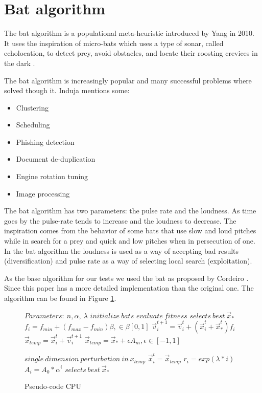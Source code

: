 \documentclass[conference]{IEEEtran}
\begin{document}

\section{Bat algorithm} \label{bat} %

The bat algorithm is a populational meta-heuristic introduced by Yang \cite{original} in
2010. It uses the inspiration of micro-bats which uses a type of sonar,
called echolocation, to detect prey, avoid obstacles, and locate their
roosting crevices in the dark \cite{original}.

The bat algorithm is increasingly popular and many successful problems
where solved though it. Induja \cite{bat-usage} mentions some:

\begin{itemize}
\item Clustering
\item Scheduling
\item Phishing detection
\item Document de-duplication
\item Engine rotation tuning
\item Image processing
\end{itemize}


The bat algorithm has two parameters: the pulse rate and the loudness.
As time goes by the pulse-rate tends to increase and the loudness to
decrease. The inspiration comes from the behavior of some bats that use
 slow and loud pitches while in search for a prey and quick
and low pitches when in persecution of one. In the bat algorithm the
loudness is used as a way of accepting bad results (diversification) and
pulse rate as a way of selecting local search (exploitation).

As the base algorithm for our tests we used the bat as proposed by
Cordeiro \cite{comparisonBatParpinelli}. Since this paper has a more detailed
implementation than the original one. The algorithm can be found in Figure \ref{cpu-pseudo}.

\begin{figure}[H]
\begin{algorithmic}[1]
\State $Parameters:\ n,\alpha,\ \lambda$
\State $initialize\ bats$
\State $evaluate\ fitness$
\State $selects\ best\ \vec{x}_*$
        \State $f_i=f_{min} + (f_{max} - f_{min})\beta, \in \beta [0,1]$
        \State $\vec{v}_i^{t+1} = \vec{v}_i^{t} + (\vec{x}_i^{t} + \vec{x}_*^{t})f_i$
        \State $\vec{x}_{temp} = \vec{x}_i^{t} + \vec{v}_i^{t+1}$
            \State $\vec{x}_{temp} = \vec{x}_* + \epsilon A_m, \epsilon \in [-1, 1]$
        \EndIf

        \State $single\ dimension\ perturbation\ in\ x_{temp}$
            \State $\vec{x}_i^t = \vec{x}_{temp}$
            \State $r_i = exp(\lambda * i)$
            \State $A_i =  A_{0} * \alpha^i$
        \EndIf
    \EndFor
    \State $selects\ best\ \vec{x}_*$
\EndWhile
\end{algorithmic}
\caption{Pseudo-code CPU}\label{cpu-pseudo}
\end{figure}
\end{document}
